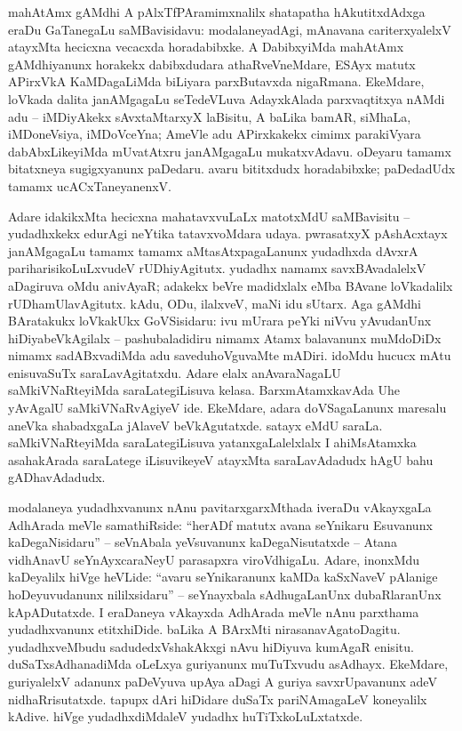 mahAtAmx gAMdhi A pAlxTfPAramimxnalilx shatapatha hAkutitxdAdxga eraDu GaTanegaLu saMBavisidavu: modalaneyadAgi, mAnavana cariterxyalelxV atayxMta hecicxna vecacxda horadabibxke. A DabibxyiMda mahAtAmx gAMdhiyanunx horakekx dabibxdudara athaRveVneMdare, ESAyx matutx APirxVkA KaMDagaLiMda biLiyara parxButavxda nigaRmana. EkeMdare, loVkada dalita janAMgagaLu seTedeVLuva AdayxkAlada parxvaqtitxya nAMdi adu -- iMDiyAkekx sAvxtaMtarxyX laBisitu, A baLika bamAR, siMhaLa, iMDoneVsiya, iMDoVceYna; AmeVle adu APirxkakekx cimimx parakiVyara dabAbxLikeyiMda mUvatAtxru janAMgagaLu mukatxvAdavu. oDeyaru tamamx bitatxneya sugigxyanunx paDedaru. avaru bititxdudx horadabibxke; paDedadUdx tamamx ucACxTaneyanenxV.

Adare idakikxMta hecicxna mahatavxvuLaLx matotxMdU saMBavisitu -- yudadhxkekx edurAgi neYtika tatavxvoMdara udaya. pwrasatxyX pAshAcxtayx janAMgagaLu tamamx tamamx aMtasAtxpagaLanunx yudadhxda dAvxrA pariharisikoLuLxvudeV rUDhiyAgitutx. yudadhx namamx savxBAvadalelxV aDagiruva oMdu anivAyaR; adakekx beVre madidxlalx eMba BAvane loVkadalilx rUDhamUlavAgitutx. kAdu, ODu, ilalxveV, maNi idu sUtarx. Aga gAMdhi BAratakukx loVkakUkx GoVSisidaru: ivu mUrara peYki niVvu yAvudanUnx hiDiyabeVkAgilalx -- pashubaladidiru nimamx Atamx balavanunx muMdoDiDx nimamx sadABxvadiMda adu saveduhoVguvaMte mADiri. idoMdu hucucx mAtu enisuvaSuTx saraLavAgitatxdu. Adare elalx anAvaraNagaLU saMkiVNaRteyiMda saraLategiLisuva kelasa. BarxmAtamxkavAda Uhe yAvAgalU saMkiVNaRvAgiyeV ide. EkeMdare, adara doVSagaLanunx maresalu aneVka shabadxgaLa jAlaveV beVkAgutatxde. satayx eMdU saraLa. saMkiVNaRteyiMda saraLategiLisuva yatanxgaLalelxlalx I ahiMsAtamxka asahakArada saraLatege iLisuvikeyeV atayxMta saraLavAdadudx hAgU bahu gADhavAdadudx. 

modalaneya yudadhxvanunx nAnu pavitarxgarxMthada iveraDu vAkayxgaLa AdhArada meVle samathiRside: ``herADf matutx avana seYnikaru Esuvanunx kaDegaNisidaru'' -- seVnAbala yeVsuvanunx kaDegaNisutatxde -- Atana vidhAnavU seYnAyxcaraNeyU parasapxra viroVdhigaLu. Adare, inonxMdu kaDeyalilx hiVge heVLide: ``avaru seYnikaranunx kaMDa kaSxNaveV pAlanige hoDeyuvudanunx nililxsidaru'' -- seYnayxbala sAdhugaLanUnx dubaRlaranUnx kApADutatxde. I eraDaneya vAkayxda AdhArada meVle nAnu parxthama yudadhxvanunx etitxhiDide. baLika A BArxMti nirasanavAgatoDagitu. yudadhxveMbudu sadudedxVshakAkxgi nAvu hiDiyuva kumAgaR enisitu. duSaTxsAdhanadiMda oLeLxya guriyanunx muTuTxvudu asAdhayx. EkeMdare, guriyalelxV adanunx paDeVyuva upAya aDagi A guriya savxrUpavanunx adeV nidhaRrisutatxde. tapupx dAri hiDidare duSaTx pariNAmagaLeV koneyalilx kAdive. hiVge yudadhxdiMdaleV yudadhx huTiTxkoLuLxtatxde.

